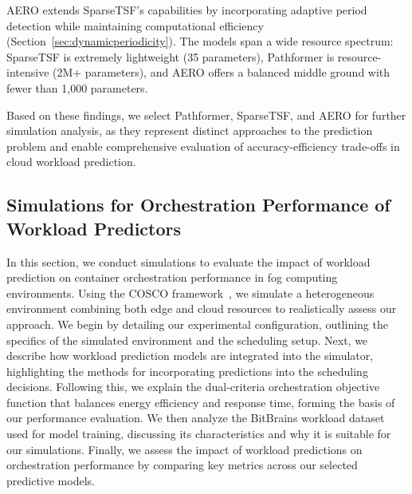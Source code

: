 \documentclass{ieeetmlcn}
\begin{document}
AERO extends SparseTSF's capabilities by incorporating adaptive period detection while maintaining computational efficiency (Section~\ref{sec:dynamicperiodicity}). The models span a wide resource spectrum: SparseTSF is extremely lightweight (35 parameters), Pathformer is resource-intensive (2M+ parameters), and AERO offers a balanced middle ground with fewer than 1,000 parameters.

Based on these findings, we select Pathformer, SparseTSF, and AERO for further simulation analysis, as they represent distinct approaches to the prediction problem and enable comprehensive evaluation of accuracy-efficiency trade-offs in cloud workload prediction.


\subsection{Simulations for Orchestration Performance of Workload Predictors}
\label{sec:simulations}


{\color{blue}
In this section, we conduct simulations to evaluate the impact of workload prediction on container orchestration performance in fog computing environments. Using the COSCO framework~\cite{tuli2021cosco}, we simulate a heterogeneous environment combining both edge and cloud resources to realistically assess our approach. We begin by detailing our experimental configuration, outlining the specifics of the simulated environment and the scheduling setup. Next, we describe how workload prediction models are integrated into the simulator, highlighting the methods for incorporating predictions into the scheduling decisions. Following this, we explain the dual-criteria orchestration objective function that balances energy efficiency and response time, forming the basis of our performance evaluation. We then analyze the BitBrains workload dataset used for model training, discussing its characteristics and why it is suitable for our simulations. Finally, we assess the impact of workload predictions on orchestration performance by comparing key metrics across our selected predictive models.
}
\end{document}
